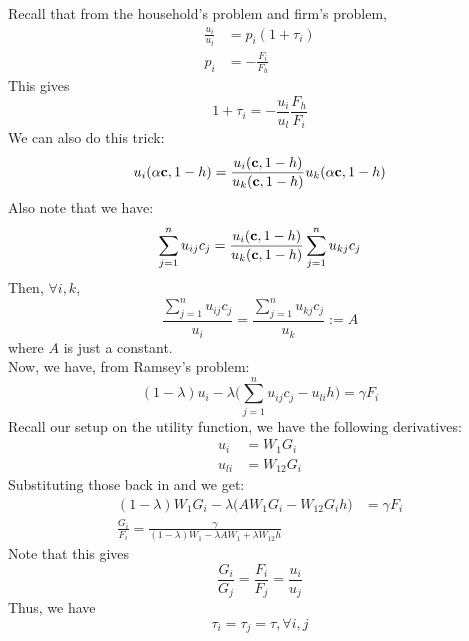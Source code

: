 \documentclass[12pt]{article}
\begin{document}
	\noindent
	Recall that from the household's problem and firm's problem,
	\begin{align*}
		\frac{u_i}{u_l} &= p_i (1 + \tau_i)\\
		p_i &= -\frac{F_i}{F_h}
	\end{align*}
	This gives
	\begin{equation*}
		1 + \tau_i = - \frac{u_i}{u_l} \frac{F_h}{F_i}
	\end{equation*}
	We can also do this trick:
	\begin{equation*}
		u_i(\alpha \bold{c}, 1-h) = \frac{u_i(\bold{c}, 1-h)}{u_k(\bold{c}, 1-h)}u_k(\alpha \bold{c}, 1-h)
	\end{equation*}
	Also note that we have:
	\begin{equation*}
		\sum_{j=1}^n u_{ij}c_j = \frac{u_i(\bold{c}, 1-h)}{u_k(\bold{c}, 1-h)} \sum_{j=1}^n u_{kj}c_j
	\end{equation*}
	Then, $\forall i, k$,
	\begin{equation*}
		\frac{\sum_{j=1}^n u_{ij}c_j }{u_i} = \frac{\sum_{j=1}^n u_{kj}c_j }{u_k}:=A
	\end{equation*}
	where $A$ is just a constant.\\
	Now, we have, from Ramsey's problem:
	\begin{equation*}
		(1-\lambda)u_i - \lambda\big(\sum_{j=1}^{n}u_{ij}c_j - u_{li}h \big) = \gamma F_i
	\end{equation*}
	Recall our setup on the utility function, we have the following derivatives:
	\begin{align*}
		u_i &= W_1G_i\\
		u_{li} &= W_{12}G_i
	\end{align*}
	Substituting those back in and we get:
	\begin{align*}
		(1-\lambda)W_1G_i - \lambda \big(AW_1G_i - W_{12}G_ih \big) &= \gamma F_i\\
		\frac{G_i}{F_i} = \frac{\gamma}{(1-\lambda)W_1 - \lambda A W_1 + \lambda W_{12}h}
	\end{align*}
	Note that this gives
	\begin{equation*}
		\frac{G_i}{G_j} = \frac{F_i}{F_j} = \frac{u_i}{u_j}
	\end{equation*}
	Thus, we have
	\begin{equation*}
		\tau_i = \tau_j = \tau, \forall i,j
	\end{equation*}
\end{document}
